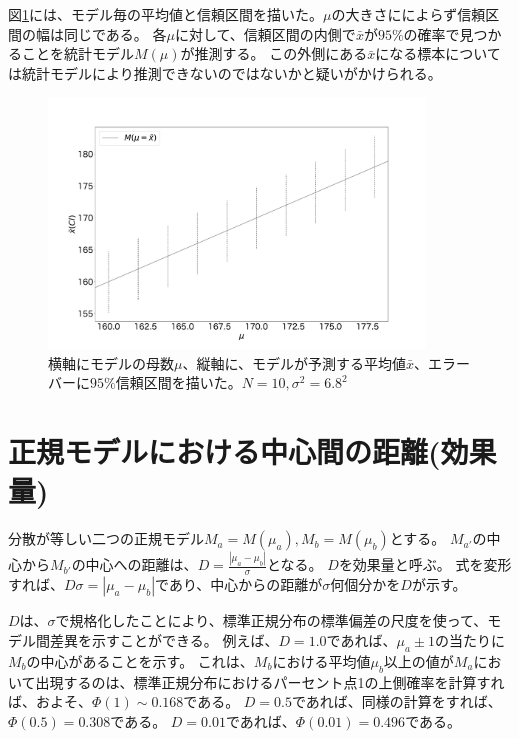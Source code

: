 図\ref{fig:confidence_interval_model}には、モデル毎の平均値と信頼区間を描いた。$\mu$の大きさにによらず信頼区間の幅は同じである。
各$\mu$に対して、信頼区間の内側で$\bar{x}$が$95\%$の確率で見つかることを統計モデル$M(\mu)$が推測する。
この外側にある$\bar{x}$になる標本については統計モデルにより推測できないのではないかと疑いがかけられる。

\begin{figure}
    \begin{center}
        \includegraphics[width=10cm]{./image/04_/confidence_interval_model.pdf}
        \caption{横軸にモデルの母数$\mu$、縦軸に、モデルが予測する平均値$\bar{x}$、エラーバーに$95\%$信頼区間を描いた。$N=10,\sigma^2=6.8^2$}
        \label{fig:confidence_interval_model}

      \end{center}
    \end{figure}


\section{正規モデルにおける中心間の距離(効果量)}
分散が等しい二つの正規モデル$M_a=M(\mu_a),M_b=M(\mu_b)$とする。
$M_{a'}$の中心から$M_{b'}$の中心への距離は、$D=\frac{|\mu_a-\mu_b|}{\sigma}$となる。
$D$を効果量と呼ぶ。
式を変形すれば、$D\sigma = |\mu_a-\mu_b|$であり、中心からの距離が$\sigma$何個分かを$D$が示す。



$D$は、$\sigma$で規格化したことにより、標準正規分布の標準偏差の尺度を使って、モデル間差異を示すことができる。
例えば、$D=1.0$であれば、$\mu_a\pm 1$の当たりに$M_b$の中心があることを示す。
これは、$M_b$における平均値$\mu_b$以上の値が$M_a$において出現するのは、標準正規分布におけるパーセント点1の上側確率を計算すれば、およそ、$\varPhi(1)\sim0.168$である。
$D=0.5$であれば、同様の計算をすれば、$\varPhi(0.5)=0.308$である。
$D=0.01$であれば、$\varPhi(0.01)=0.496$である。
\fi



